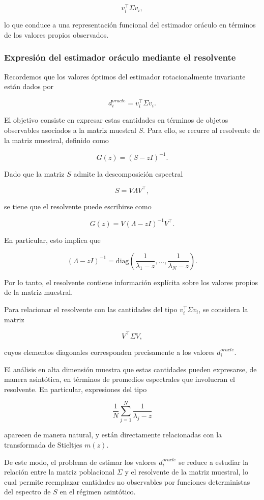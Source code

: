 \documentclass[letterpaper,12pt,oneside]{book}
\begin{document}
\[
v_i^\top \Sigma v_i,
\]

lo que conduce a una representación funcional del estimador oráculo en términos de los valores propios observados.

\subsubsection*{Expresión del estimador oráculo mediante el resolvente}

Recordemos que los valores óptimos del estimador rotacionalmente invariante están dados por

\[
d_i^{oracle}=v_i^\top \Sigma v_i.
\]

El objetivo consiste en expresar estas cantidades en términos de objetos observables asociados a la matriz muestral $S$. Para ello, se recurre al resolvente de la matriz muestral, definido como

\[
G(z) = (S - zI)^{-1}.
\]

Dado que la matriz $S$ admite la descomposición espectral

\[
S = V \Lambda V^\top,
\]

se tiene que el resolvente puede escribirse como

\[
G(z) = V (\Lambda - zI)^{-1} V^\top.
\]

En particular, esto implica que

\[
(\Lambda - zI)^{-1} = \mathrm{diag}\left(\frac{1}{\lambda_1 - z}, \dots, \frac{1}{\lambda_N - z}\right).
\]

Por lo tanto, el resolvente contiene información explícita sobre los valores propios de la matriz muestral.

Para relacionar el resolvente con las cantidades del tipo $v_i^\top \Sigma v_i$, se considera la matriz

\[
V^\top \Sigma V,
\]

cuyos elementos diagonales corresponden precisamente a los valores $d_i^{oracle}$.

El análisis en alta dimensión muestra que estas cantidades pueden expresarse, de manera asintótica, en términos de promedios espectrales que involucran el resolvente. En particular, expresiones del tipo

\[
\frac{1}{N} \sum_{j=1}^N \frac{1}{\lambda_j - z}
\]

aparecen de manera natural, y están directamente relacionadas con la transformada de Stieltjes $m(z)$.

De este modo, el problema de estimar los valores $d_i^{oracle}$ se reduce a estudiar la relación entre la matriz poblacional $\Sigma$ y el resolvente de la matriz muestral, lo cual permite reemplazar cantidades no observables por funciones deterministas del espectro de $S$ en el régimen asintótico.
\end{document}
